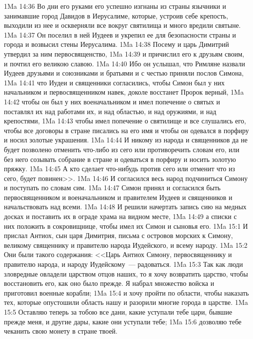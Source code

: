 \vs 1Ma 14:36 Во дни его руками его успешно изгнаны из страны язычники и занимавшие город Давидов в Иерусалиме, которые, устроив себе крепость, выходили из нее и оскверняли все вокруг святилища и много вредили святыне.
\vs 1Ma 14:37 Он поселил в ней Иудеев и укрепил ее для безопасности страны и города и возвысил стены Иерусалима.
\vs 1Ma 14:38 Посему и царь Димитрий утвердил за ним первосвященство,
\vs 1Ma 14:39 и причислил его к друзьям своим, и почтил его великою славою.
\vs 1Ma 14:40 Ибо он услышал, что Римляне назвали Иудеев друзьями и союзниками и братьями и с честью приняли послов Симона,
\vs 1Ma 14:41 что Иудеи и священники согласились, чтобы Симон был у них начальником и первосвященником навек, доколе восстанет Пророк верный,
\vs 1Ma 14:42 чтобы он был у них военачальником и имел попечение о святых и поставлял их над работами их, и над областью, и над оружиями, и над крепостями,
\vs 1Ma 14:43 чтобы имел попечение о святилище и все слушались его, чтобы все договоры в стране писались на его имя и чтобы он одевался в порфиру и носил золотые украшения.
\vs 1Ma 14:44 И никому из народа и священников да не будет позволено отменить что-либо из сего или противоречить словам его, или без него созывать собрание в стране и одеваться в порфиру и носить золотую пряжку.
\vs 1Ma 14:45 А кто сделает что-нибудь против сего или отменит что из сего, будет повинен>>.
\vs 1Ma 14:46 И согласился весь народ подчиниться Симону и поступать по словам сим.
\vs 1Ma 14:47 Симон принял и согласился быть первосвященником и военачальником и правителем Иудеев и священников и начальствовать над всеми.
\vs 1Ma 14:48 И решили начертать запись сию на медных досках и поставить их в ограде храма на видном месте,
\vs 1Ma 14:49 а списки с них положить в сокровищнице, чтобы имел их Симон и сыновья его.
\vs 1Ma 15:1 И прислал Антиох, сын царя Димитрия, письма с островов морских к Симону, великому священнику и правителю народа Иудейского, и всему народу.
\vs 1Ma 15:2 Они были такого содержания: <<Царь Антиох Симону, первосвященнику и правителю народа, и народу Иудейскому~--- радоваться.
\vs 1Ma 15:3 Так как люди зловредные овладели царством отцов наших, то я хочу возвратить царство, чтобы восстановить его, как оно было прежде. Я набрал множество войска и приготовил военные корабли;
\vs 1Ma 15:4 и хочу пройти по области, чтобы наказать тех, которые опустошили область нашу и разорили многие города в царстве.
\vs 1Ma 15:5 Оставляю теперь за тобою все дани, какие уступали тебе цари, бывшие прежде меня, и другие дары, какие они уступали тебе;
\vs 1Ma 15:6 дозволяю тебе чеканить свою монету в стране твоей.

